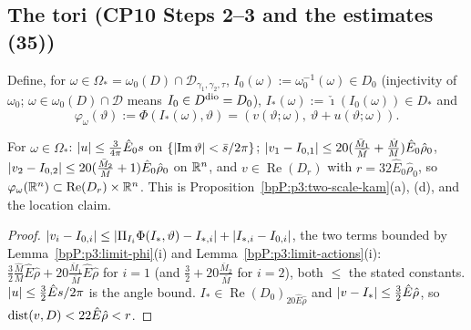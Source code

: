 \subsection{The tori (CP10 Steps 2--3 and the estimates (35))}\label{bpP:p3:tori}

Define, for $\omega\in\Omega_*=\omega_0(D)\cap\mathcal D_{\gamma_1,\gamma_2,\tau}$, $I_0(\omega):=\omega_0^{-1}(\omega)\in D_0$ (injectivity of $\omega_0$; $\omega\in\omega_0(D)\cap\mathcal D$ means $I_0\in D^{\rm dio}=D_0$), $I_*(\omega):=\check\imath(I_0(\omega))\in D_*$ and
\[\varphi_\omega(\vartheta):=\Phi(I_*(\omega),\vartheta)=(v(\vartheta;\omega),\ \vartheta+u(\vartheta;\omega)).\]

\begin{lemma}\label{bpP:p3:estimates}
For $\omega\in\Omega_*$: $\lvert u\rvert\le\frac3{4\pi}\hat E_0s$ on $\{\lvert \operatorname{Im}\vartheta\rvert<\bar s/2\pi\}$; $\lvert v_1-I_{0,1}\rvert\le20(\frac{\bar M_1}{\bar M}+\frac{\hat M}M)\hat E_0\hat\rho_0$, $\lvert v_2-I_{0,2}\rvert\le20(\frac{\bar M_2}{\bar M}+1)\hat E_0\hat\rho_0$ on $\mathbb{R}^n$, and $v\in\operatorname{Re}(D_{r})$ with $r=32\hat E_0\hat\rho_0$, so $\varphi_\omega(\mathbb{R}^n)\subset\operatorname{Re}(D_r)\times\mathbb{R}^n$.
This is Proposition~\ref{bpP:p3:two-scale-kam}(a), (d), and the location claim.
\end{lemma}
\begin{proof}
\label{stepP:p3:es-sup}
$\lvert v_i-I_{0,i}\rvert\le\lvert \Pi_{I_i}\Phi(I_*,\vartheta)-I_{*,i}\rvert+\lvert I_{*,i}-I_{0,i}\rvert$, the two terms bounded by Lemma~\ref{bpP:p3:limit-phi}(i) and Lemma~\ref{bpP:p3:limit-actions}(i): $\frac32\frac{\hat M}M\hat E\hat\rho+20\frac{\bar M_1}{\bar M}\hat E\hat\rho$ for $i=1$ (and $\frac32+20\frac{\bar M_2}{\bar M}$ for $i=2$), both $\le$ the stated constants. $\lvert u\rvert\le\frac32\hat Es/2\pi$ is the angle bound.
\label{stepP:p3:es-loc}
$I_*\in\operatorname{Re}(D_0)_{20\hat E\hat\rho}$ and $\lvert v-I_*\rvert\le\frac32\hat E\hat\rho$, so $\operatorname{dist}(v,D)<22\hat E\hat\rho<r$.
\end{proof}

